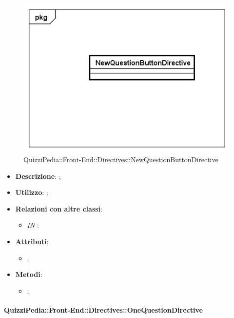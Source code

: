 \begin{figure}[h]
	\centering
	\includegraphics[scale=0.5,keepaspectratio]{UML/Classi/Front-End/QuizziPedia_Front-end_Directives_NewQuestionButtonDirective.png}
	\caption{QuizziPedia::Front-End::Directives::NewQuestionButtonDirective}
\end{figure}

\begin{itemize}
	\item \textbf{Descrizione}: ;
	\item \textbf{Utilizzo}: ;
	\item \textbf{Relazioni con altre classi}: 
	\begin{itemize}
		\item \textit{IN} \texttt{}: 
	\end{itemize}
	\item \textbf{Attributi}: 
	\begin{itemize}
		\item ;
	\end{itemize}
	\item \textbf{Metodi}: 
	\begin{itemize}
		\item ;
	\end{itemize}
\end{itemize}

\paragraph{QuizziPedia::Front-End::Directives::OneQuestionDirective}

\label{QuizziPedia::Front-End::Directives::OneQuestionDirective}

